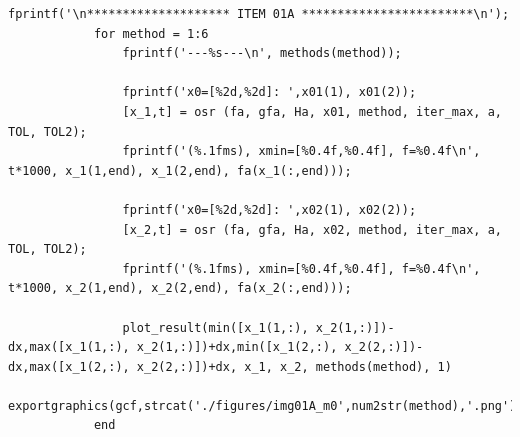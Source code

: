 \documentclass[10pt, a4paper]{article}
\begin{document}
\begin{minipage}{\linewidth}
      \begin{lstlisting}[style=myStyle, caption=script t01.m chamando o script osr.m para a fun\c c\~ao do item 1a para cada um dos 6 m\'etodos estudados, label=l2]
            fprintf('\n******************** ITEM 01A ************************\n');
            for method = 1:6
                fprintf('---%s---\n', methods(method));

                fprintf('x0=[%2d,%2d]: ',x01(1), x01(2));
                [x_1,t] = osr (fa, gfa, Ha, x01, method, iter_max, a, TOL, TOL2);
                fprintf('(%.1fms), xmin=[%0.4f,%0.4f], f=%0.4f\n', t*1000, x_1(1,end), x_1(2,end), fa(x_1(:,end)));

                fprintf('x0=[%2d,%2d]: ',x02(1), x02(2));
                [x_2,t] = osr (fa, gfa, Ha, x02, method, iter_max, a, TOL, TOL2);
                fprintf('(%.1fms), xmin=[%0.4f,%0.4f], f=%0.4f\n', t*1000, x_2(1,end), x_2(2,end), fa(x_2(:,end)));

                plot_result(min([x_1(1,:), x_2(1,:)])-dx,max([x_1(1,:), x_2(1,:)])+dx,min([x_1(2,:), x_2(2,:)])-dx,max([x_1(2,:), x_2(2,:)])+dx, x_1, x_2, methods(method), 1)
                exportgraphics(gcf,strcat('./figures/img01A_m0',num2str(method),'.png'),'Resolution',500)
            end
      \end{lstlisting}
\end{minipage}
\end{document}
